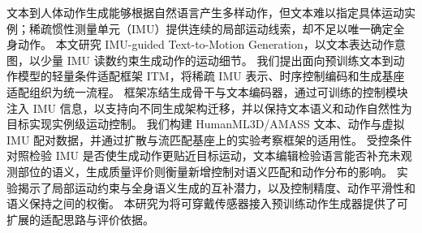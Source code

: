 
文本到人体动作生成能够根据自然语言产生多样动作，但文本难以指定具体运动实例；稀疏惯性测量单元（IMU）提供连续的局部运动线索，却不足以唯一确定全身动作。
本文研究 IMU-guided Text-to-Motion Generation，以文本表达动作意图，以少量 IMU 读数约束生成动作的运动细节。
我们提出面向预训练文本到动作模型的轻量条件适配框架 ITM，将稀疏 IMU 表示、时序控制编码和生成基座适配组织为统一流程。
框架冻结生成骨干与文本编码器，通过可训练的控制模块注入 IMU 信息，以支持向不同生成架构迁移，并以保持文本语义和动作自然性为目标实现实例级运动控制。
我们构建 HumanML3D/AMASS 文本、动作与虚拟 IMU 配对数据，并通过扩散与流匹配基座上的实验考察框架的适用性。
受控条件对照检验 IMU 是否使生成动作更贴近目标运动，文本编辑检验语言能否补充未观测部位的语义，生成质量评价则衡量新增控制对语义匹配和动作分布的影响。
实验揭示了局部运动约束与全身语义生成的互补潜力，以及控制精度、动作平滑性和语义保持之间的权衡。
本研究为将可穿戴传感器接入预训练动作生成器提供了可扩展的适配思路与评价依据。
